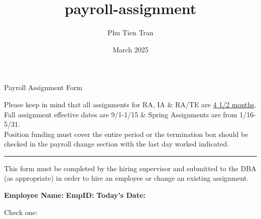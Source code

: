 \documentclass{article}
\title{payroll-assignment}
\author{Phu Tien Tran}
\date{March 2025}
\begin{document}
\thispagestyle{empty}

\begin{center}
    \LARGE
    Payroll Assignment Form\vspace{-0.2cm}
\end{center}

\begin{center}
    \color{Bittersweet}
    \scriptsize
    \rmfamily
    Please keep in mind that all assignments for RA, IA \& RA/TE are \underline {4 1/2 months}. Fall assignment effective dates are 9/1-1/15 \& Spring Assignments are from 1/16-5/31. \\    
    Position funding must cover the entire period or the termination box should be checked in the payroll change section with the last day worked indicated.
    \color{black}\par\rule{\textwidth}{0.1pt}
    \vspace{-0.6cm}
    \begin{changemargin}{4cm}{4cm} 
    \color{blue}\normalsize\centering
    This form must be completed by the hiring supervisor and submitted to the DBA (as appropriate) in order to hire an employee or change an existing assignment.
    \end{changemargin}
\end{center}
\vspace{-0.6cm}
\begin{tcolorbox}[standard jigsaw, opacityback=0]
    \begin{Form}
        \textbf{Employee Name:} \TextField[name=emp_name, width=5cm]{} 
        \hspace{0.3cm} \textbf{EmpID:} \TextField[name=emp_id, width=3cm]{}
        \hspace{0.3cm} \textbf{Today’s Date:} \TextField[name=today_date, width=3cm]{}

        \vspace{0.2cm}
        {Check one:}%
        \hspace{2cm}
    \end{Form}
\end{tcolorbox}
\end{document}

